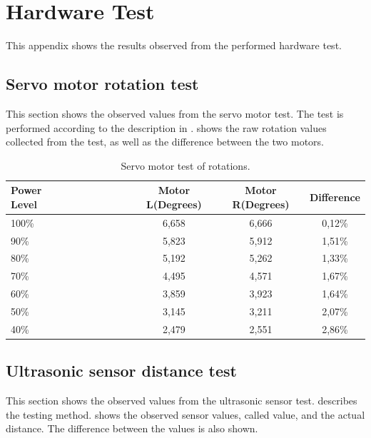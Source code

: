 \chapter{Hardware Test} \label{app:hardware_test}
This appendix shows the results observed from the performed hardware test.

\section*{Servo motor rotation test} \label{app:servo_motor_test}
This section shows the observed values from the servo motor test. The test is performed according to the description in .  shows the raw rotation values collected from the test, as well as the difference between the two motors. 

\begin{table}[H]
	\centering
    \begin{tabular}{lccc}
    \hline  
    \rowcolor{DGray}
    \textbf{Power Level}~~~~~~~~~~~~ & Motor L(Degrees) & Motor R(Degrees) & Difference \\ \hline 
    100\%                  & 6,658                  & 6,666                & 0,12\% \\
    90\%                   & 5,823                  & 5,912                & 1,51\% \\
    80\%                   & 5,192                  & 5,262                & 1,33\% \\
    70\%                   & 4,495                  & 4,571                & 1,67\% \\
    60\%                   & 3,859                  & 3,923                & 1,64\% \\
    50\%                   & 3,145                  & 3,211                & 2,07\% \\
    40\%                   & 2,479                  & 2,551                & 2,86\% \\
    \hline  
    \end{tabular}
    \caption{\label{table:app_motor_test}Servo motor test of rotations.}
\end{table}


\section*{Ultrasonic sensor distance test} \label{app:ultrasonic_sensor_test}
This section shows the observed values from the ultrasonic sensor test.  describes the testing method.  shows the observed sensor values, called value, and the actual distance. The difference between the values is also shown. 

